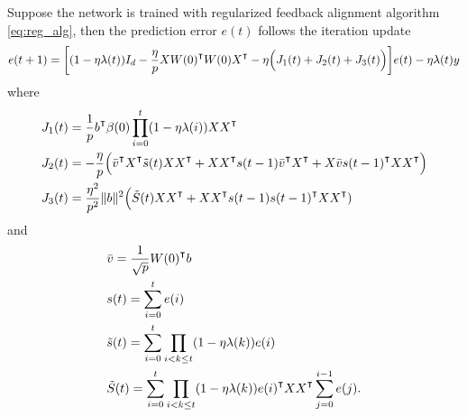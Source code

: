 \begin{lemma}
\label{lma:one_step_update}
Suppose the network is trained with regularized feedback alignment algorithm \eqref{eq:reg_alg}, then the prediction error $e(t)$ follows the iteration update
\begin{equation}
\label{eq:err_update}
\begin{aligned}
    e(t+1) = \bigg[(1-\eta\lambda(t))I_d - \frac{\eta}{p}XW(0)\transpose W(0)X\transpose -\eta\Big(J_1(t)+J_2(t)+J_3(t)\Big)\bigg]e(t) -\eta\lambda(t)y
\end{aligned}
\end{equation}
where
\begin{equation*}
\begin{aligned}
&J_1(t) = \frac{1}{p}b\transpose\beta(0)\prod_{i=0}^{t}(1-\eta\lambda(i))XX\transpose \\
&J_2(t) = -\frac{\eta}{p}\Big(\bar{v}\transpose X\transpose \tilde{s}(t) XX\transpose+ XX\transpose s(t-1)\bar{v}\transpose X\transpose + X \bar{v}s(t-1)\transpose XX\transpose\Big) \\
&J_3(t) = \frac{\eta^2}{p^2}\|b\|^2\Big(\tilde{S}(t)XX\transpose + XX\transpose s(t-1)s(t-1)\transpose XX\transpose)
\end{aligned} 
\end{equation*}
and
\begin{equation*}
\begin{aligned}
&\bar{v} = \frac{1}{\sqrt p}W(0)\transpose b \\
&s(t) = \sum_{i=0}^{t}e(i) \\
&\tilde{s}(t) = \sum_{i=0}^{t}\prod_{i<k\leq t}(1-\eta\lambda(k)) e(i) \\
&\tilde{S}(t) = \sum_{i=0}^{t}\prod_{i<k\leq t}(1-\eta\lambda(k))e(i)\transpose XX\transpose \sum_{j=0}^{i-1}e(j).
\end{aligned}
\end{equation*}
\end{lemma}

